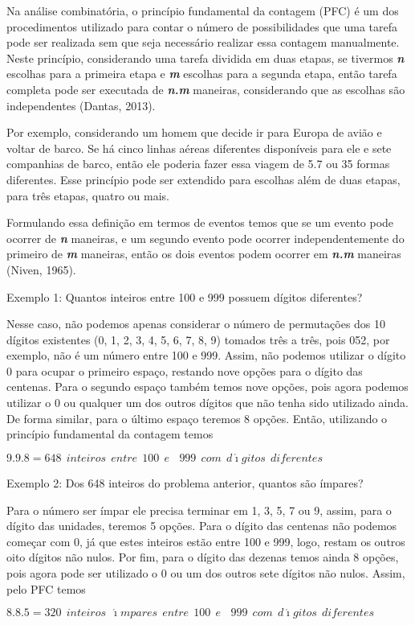 Na análise combinatória, o princípio fundamental da contagem (PFC) é um dos procedimentos utilizado para contar o número de possibilidades que uma tarefa pode ser realizada sem que seja necessário realizar essa contagem manualmente.
Neste princípio, considerando uma tarefa dividida em duas etapas, se tivermos \textbf{\textit{n}} escolhas para a primeira etapa e \textbf{\textit{m}} escolhas para a segunda etapa, então tarefa completa pode ser executada de \textbf{\textit{n.m}} maneiras, considerando que as escolhas são independentes (Dantas, 2013).

Por exemplo, considerando um homem que decide ir para Europa de avião e voltar de barco. Se há cinco linhas aéreas diferentes disponíveis para ele e sete companhias de barco, então ele poderia fazer essa viagem de 5.7 ou 35 formas diferentes.
Esse princípio pode ser extendido para escolhas além de duas etapas, para três etapas, quatro ou mais.

Formulando essa definição em termos de eventos temos que se um evento pode ocorrer de \textbf{\textit{n}} maneiras, e um segundo evento pode ocorrer independentemente do primeiro de \textbf{\textit{m}} maneiras, então os dois eventos podem ocorrer em \textbf{\textit{n.m}} maneiras (Niven, 1965).

\noindent
Exemplo 1: Quantos inteiros entre 100 e 999 possuem dígitos diferentes?

Nesse caso, não podemos apenas considerar o número de permutações dos 10 dígitos existentes (0, 1, 2, 3, 4, 5, 6, 7, 8, 9) tomados três a três, pois 052, por exemplo, não é um número entre 100 e 999. Assim, não podemos utilizar o dígito 0 para ocupar o primeiro espaço, restando nove opções para o dígito das centenas. Para o segundo espaço também temos nove opções, pois agora podemos utilizar o 0 ou qualquer um dos outros dígitos que não tenha sido utilizado ainda. De forma similar, para o último espaço teremos 8 opções.
Então, utilizando o princípio fundamental da contagem temos 

\begin{center}
	$9.9.8 = 648 \ \ inteiros \ \ entre \ \ 100 \ \ e \ \ \ \ 999 \ \ com \ \ {d\acute{\imath}gitos} \ \ diferentes$ 
\end{center}

\noindent
Exemplo 2: Dos 648 inteiros do problema anterior, quantos são ímpares?

Para o número ser ímpar ele precisa terminar em 1, 3, 5, 7 ou 9, assim, para o dígito das unidades, teremos 5 opções.
Para o dígito das centenas não podemos começar com 0, já que estes inteiros estão entre 100 e 999, logo, restam os outros oito dígitos não nulos.
Por fim, para o dígito das dezenas temos ainda 8 opções, pois agora pode ser utilizado o 0 ou um dos  outros sete dígitos não nulos. Assim, pelo PFC temos
\begin{center}
	$8.8.5 = 320 \ \ inteiros \ \ {\acute{\imath}mpares}\ \ entre \ \ 100 \ \ e \ \ \ \ 999 \ \ com \ \ {d\acute{\imath}gitos} \ \ diferentes$ 
\end{center}


